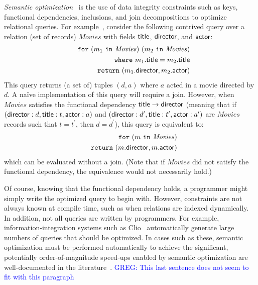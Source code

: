 \documentclass[preprint]{sigplanconf}
\newcommand{\FOR}{{\tt for} \ }
\newcommand{\WHERE}{{\tt where} \ }
\newcommand{\IN}{ \ {\tt in} \ }
\newcommand{\RETURN}{{\tt return} \ }
\newcommand{\greg}[1]{\textcolor{blue}{GREG: #1}}
\newcommand{\relation}[1]{\ensuremath{\mathit{#1}}\xspace}
\begin{document}
{\it Semantic optimization}~\cite{foundations,Deutsch:2006:QRC:1121995.1122010,Popa99anequational} is the 
use of data integrity constraints such as keys, functional dependencies, inclusions, and join decompositions to optimize relational queries. For example~\cite{foundations}, consider the following contrived query over a relation (set of records) \relation{Movies} 
with fields ${\sf title}$, ${\sf director}$, and ${\sf actor}$:
\begin{eqnarray*}
& & \FOR (m_1 \IN \relation{Movies}) \ (m_2 \IN \relation{Movies}) \\
 & & \WHERE m_1.{\sf title} = m_2.{\sf title} \\
 & & \RETURN (m_1.{\sf director}, m_2.{\sf actor})
\end{eqnarray*}        
This query returns (a set of) tuples $(d,a)$ where $a$ acted in a movie directed by $d$.  A na\"ive implementation of this query will require a join.  However, when \relation{Movies} satisfies the functional dependency ${\sf title} \to {\sf director}$ (meaning that 
if $({\sf director}: d, {\sf title}: t, {\sf actor}: a)$ and $({\sf director}: d^\prime, {\sf title}: t^\prime, {\sf actor}: a^\prime)$ are \relation{Movies} records such that $t = t^\prime$, then $d = d^\prime$), this query is equivalent to:
\begin{eqnarray*}
& & \FOR (m \IN \relation{Movies}) \\
 & & \RETURN (m.{\sf director}, m.{\sf actor})
 \end{eqnarray*}
which can be evaluated without a join.  (Note that if \relation{Movies} did not satisfy the functional dependency, the equivalence would not necessarily hold.)  

Of course, knowing that the functional dependency holds, a programmer might simply write the optimized query to begin with.
However, constraints are not always known at compile time, such as when relations are indexed dynamically.
In addition, not all queries are written by programmers.
For example, information-integration systems such as Clio~\cite{haas:clio} automatically generate large numbers of queries that should be optimized.
In cases such as these, semantic optimization must be performed automatically to achieve the significant, potentially order-of-magnitude speed-ups enabled by semantic optimization are well-documented in the literature~\cite{Cheng:1999:ITS:645925.671357}.
\greg{This last sentence does not seem to fit with this paragraph}
\end{document}
